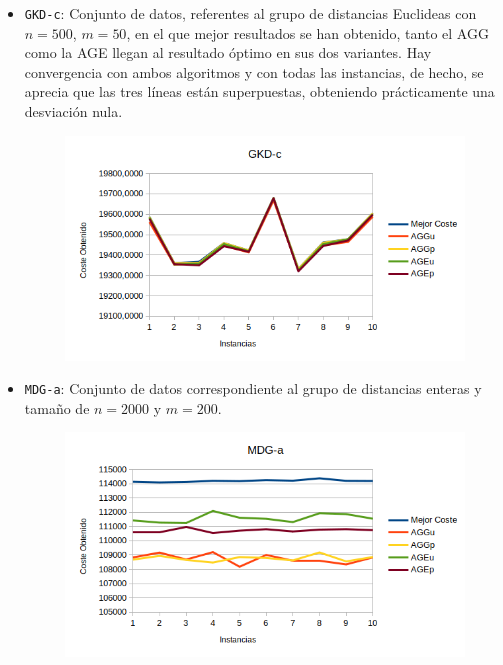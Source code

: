 \begin{itemize}
	\item \texttt{GKD-c}: Conjunto de datos, referentes al grupo de distancias Euclideas con $n=500$, $m=50$,  en el que mejor resultados se han obtenido, tanto el AGG como la AGE llegan al resultado óptimo en sus dos variantes.  Hay convergencia con ambos algoritmos y con todas las instancias, de hecho, se aprecia que las tres líneas están superpuestas, obteniendo prácticamente una desviación nula.
	
	
	\begin{figure}[H]
		\centering
		\includegraphics[scale=0.55]{img/gkdc.png}
	\end{figure}
	
	
	
	
	\item \texttt{MDG-a}: Conjunto de datos correspondiente al grupo de distancias enteras y tamaño de $n=2000$ y $m=200$. 
	
		
	\begin{figure}[H]
		\centering
		\includegraphics[scale=0.55]{img/mdga.png}
	\end{figure}
	

\end{itemize}
